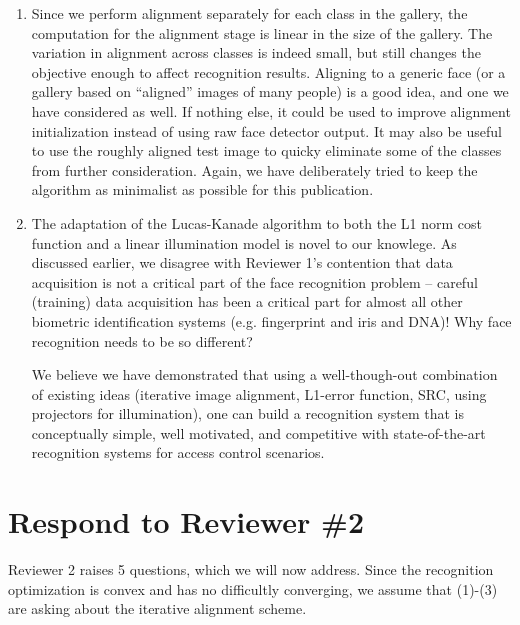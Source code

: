 \documentclass[11pt]{article}
\begin{document}
\begin{enumerate}
\item Since we perform alignment separately for each class in the gallery, the
computation for the alignment stage is linear in the size of the gallery.  The
variation in alignment across classes is indeed small, but still changes the
objective enough to affect recognition results.  Aligning to a generic face (or
a gallery based on ``aligned'' images of many people) is a good idea, and one we
have considered as well.  If nothing else, it could be used to improve
alignment initialization instead of using raw face detector output.  It may
also be useful to use the roughly aligned test image to quicky eliminate some
of the classes from further consideration.  Again, we have deliberately tried
to keep the algorithm as minimalist as possible for this publication.

\item The adaptation of the Lucas-Kanade algorithm to both the L1 norm cost
function and a linear illumination model is novel to our knowlege.  As
discussed earlier, we disagree with Reviewer 1's contention that data
acquisition is not a critical part of the face recognition problem -- careful (training) 
data acquisition has been a critical part for almost all other biometric identification 
systems (e.g. fingerprint and iris and DNA)! Why face recognition needs to be so different? 

We believe we have demonstrated that using a well-though-out combination of existing ideas
(iterative image alignment, L1-error function, SRC, using projectors for
illumination), one can build a recognition system that is conceptually simple, well
motivated, and competitive with state-of-the-art recognition systems for access
control scenarios.

\end{enumerate}

\section{Respond to Reviewer \#2}
Reviewer 2 raises 5 questions, which we will now address.  Since the
recognition optimization is convex and has no difficultly converging, we assume
that (1)-(3) are asking about the iterative alignment scheme.
\end{document}
